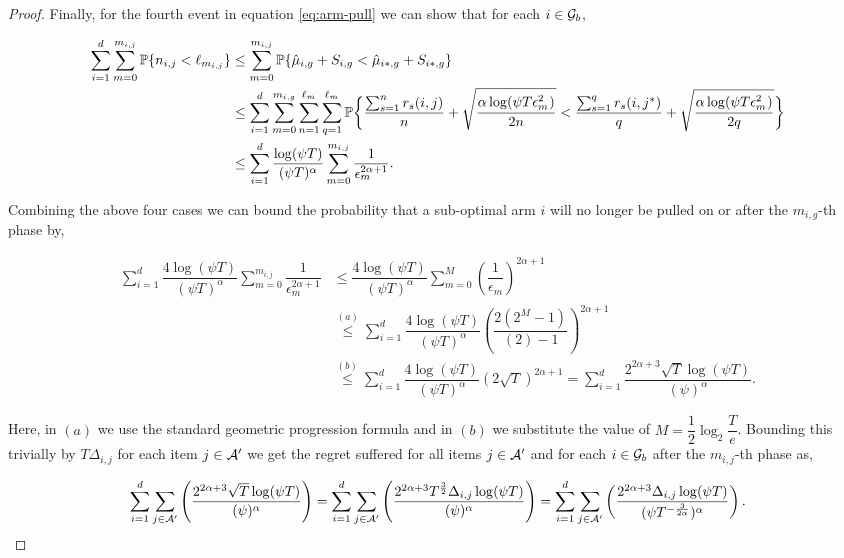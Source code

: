 \begin{proof}
Finally, for the fourth event in equation \ref{eq:arm-pull} we can show that for each $i\in\mathcal{G}_b$,

\begin{align*}
\sum_{i=1}^{d}\sum_{m=0}^{m_{i,j}}\mathbb{P}\lbrace n_{i,j} < \ell_{m_{i,j}}\rbrace &\leq \sum_{m=0}^{m_{i,j}}\mathbb{P}\lbrace \hat{\mu}_{i,g} + S_{i,g} < \hat{\mu}_{i*,g} + S_{i*,g} \rbrace\\
&\leq \sum_{i=1}^{d}\sum_{m=0}^{m_{i,g}}\sum_{n=1}^{\ell_{m_{}}}\sum_{q=1}^{\ell_{m_{}}}\mathbb{P}\bigg\lbrace  \dfrac{\sum_{s=1}^{n}  r_{s}(i,j)}{n} + \sqrt{\dfrac{\alpha\log(\psi T\epsilon_{m_{}}^2)}{2n}} <  \dfrac{\sum_{s=1}^{q} r_{s}(i,j^*)}{q} + \sqrt{\dfrac{\alpha\log(\psi T\epsilon_{m_{}}^2)}{2q}} \bigg\rbrace \\
&\leq \sum_{i=1}^{d}\dfrac{\log(\psi T)}{(\psi T)^{\alpha}}\sum_{m=0}^{m_{i,j}}\dfrac{1}{\epsilon_{m}^{2\alpha +1}}.
\end{align*}


Combining the above four cases we can bound the probability that a sub-optimal arm $i$ will no longer be pulled on or after the $m_{i,g}$-th phase by,

\begin{align*}
\sum_{i=1}^{d}\dfrac{4\log(\psi T )}{(\psi T)^{\alpha}}\sum_{m=0}^{m_{i,j}}\dfrac{1}{\epsilon_{m_{}}^{2\alpha +1}} &\leq \dfrac{4\log(\psi T )}{(\psi T)^{\alpha}}\sum_{m=0}^{M}\left(\dfrac{1}{\epsilon_{m}}\right)^{2\alpha +1}\\
& \overset{(a)}{\leq} \sum_{i=1}^{d}\dfrac{4\log(\psi T )}{(\psi T)^{\alpha}}\left(\dfrac{2(2^M - 1)}{(2) - 1}\right)^{2\alpha +1} \\
&\overset{(b)}{\leq} \sum_{i=1}^{d}\dfrac{4\log(\psi T )}{(\psi T)^{\alpha}}\left(2 \sqrt{T}\right)^{2\alpha +1} = \sum_{i=1}^{d}\dfrac{2^{2\alpha + 3}\sqrt{T}\log(\psi T )}{(\psi)^{\alpha}}.
\end{align*}

Here, in $(a)$ we use the standard geometric progression formula and  in $(b)$ we substitute the value of $M=\dfrac{1}{2}\log_{2}\dfrac{T}{e}$. Bounding this trivially by $T\Delta_{i,j}$ for each item $j\in\mathcal{A}'$ we get the regret suffered for all items $j\in\mathcal{A}'$ and for each $i\in\mathcal{G}_b$ after the $m_{i,j}$-th phase  as,

\begin{align*}
\sum_{i=1}^{d}\sum_{j\in\mathcal{A}'}\left( \dfrac{2^{2\alpha + 3}\sqrt{T}\log(\psi T )}{(\psi)^{\alpha}} \right) =  \sum_{i=1}^{d}\sum_{j\in\mathcal{A}'}\left( \dfrac{2^{2\alpha + 3}T^{\frac{3}{2}}\Delta_{i,j}\log(\psi T )}{(\psi)^{\alpha}} \right) =\sum_{i=1}^{d} \sum_{j\in\mathcal{A}'}\left( \dfrac{2^{2\alpha + 3}\Delta_{i,j}\log(\psi T )}{(\psi T^{-\frac{3}{2\alpha}})^{\alpha}} \right).
\end{align*}



\end{proof}
